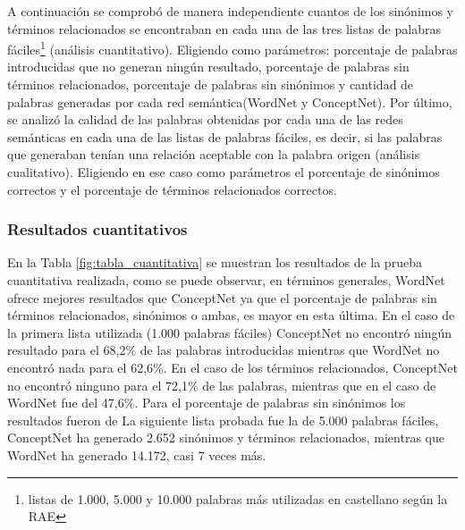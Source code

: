 A continuación se comprobó de manera independiente cuantos de los sinónimos y términos relacionados se encontraban en cada una de las tres listas de palabras fáciles\footnote{listas de 1.000, 5.000 y 10.000 palabras más utilizadas en castellano según la RAE} (análisis cuantitativo). Eligiendo como parámetros: porcentaje de palabras introducidas que no generan ningún resultado, porcentaje de palabras sin términos relacionados, porcentaje de palabras sin sinónimos  y cantidad de palabras generadas por cada red semántica(WordNet y ConceptNet). Por último, se analizó la calidad de las palabras obtenidas por cada una de las redes semánticas en cada una de las listas de palabras fáciles, es decir, si las palabras que generaban tenían una relación aceptable con la palabra origen (análisis cualitativo). Eligiendo en ese caso como parámetros el porcentaje de sinónimos correctos y el porcentaje de términos relacionados correctos.

\subsubsection{Resultados cuantitativos}
\label{cap:sec:pruebaCuantitativa}

En la Tabla \ref{fig:tabla_cuantitativa} se muestran los resultados de la prueba cuantitativa realizada, como se puede observar, en términos generales, WordNet ofrece mejores resultados que ConceptNet ya que el porcentaje de palabras sin términos relacionados, sinónimos o ambas, es mayor en esta última. En el caso de la primera lista utilizada (1.000 palabras fáciles) ConceptNet no encontró ningún resultado para el 68,2\% de las palabras introducidas mientras que WordNet no encontró nada para el 62,6\%. En el caso de los términos relacionados, ConceptNet no encontró ninguno para el 72,1\% de las palabras, mientras que en el caso de WordNet fue del 47,6\%. Para el porcentaje de palabras sin sinónimos los resultados fueron de  La siguiente lista probada fue la de 5.000 palabras fáciles, ConceptNet ha generado 2.652 sinónimos y términos relacionados, mientras que WordNet ha generado 14.172, casi 7 veces más.



